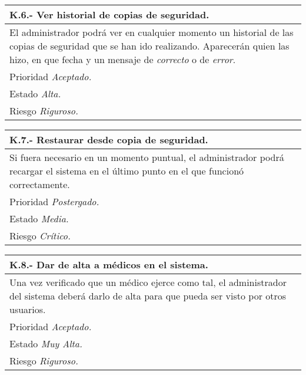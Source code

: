 \documentclass[a4paper,oneside,11pt]{book}
\begin{document}
\begin{center}
\begin{tabulary}{15cm}{|L|}
	\hline
		\bf{K.6.- Ver historial de copias de seguridad.} \\
	\hline
		El administrador podrá ver en cualquier momento un  historial de las copias de seguridad que se han ido realizando. Aparecerán quien las hizo, en que fecha y un mensaje de \textit{correcto} o de \textit{error}. \\
	\hline
		Prioridad \textit{Aceptado.} \\
	\hline
		Estado \textit{Alta.} \\
	\hline
		Riesgo \textit{Riguroso.} \\
	\hline
\end{tabulary}
\end{center}

\begin{center}
\begin{tabulary}{15cm}{|L|}
	\hline
		\bf{K.7.- Restaurar desde copia de seguridad.} \\
	\hline
		Si fuera necesario en un momento puntual, el administrador podrá recargar el sistema en el último punto en el que funcionó correctamente. \\
	\hline
		Prioridad \textit{Postergado.} \\
	\hline
		Estado \textit{Media.} \\
	\hline
		Riesgo \textit{Crítico.} \\
	\hline
\end{tabulary}
\end{center}

\begin{center}
\begin{tabulary}{15cm}{|L|}
	\hline
		\bf{K.8.- Dar de alta a médicos en el sistema.} \\
	\hline
		Una vez verificado que un médico ejerce como tal, el administrador del sistema deberá darlo de alta para que pueda ser visto por otros usuarios. \\
	\hline
		Prioridad \textit{Aceptado.} \\
	\hline
		Estado \textit{Muy Alta.} \\
	\hline
		Riesgo \textit{Riguroso.} \\
	\hline
\end{tabulary}
\end{center}
\end{document}
